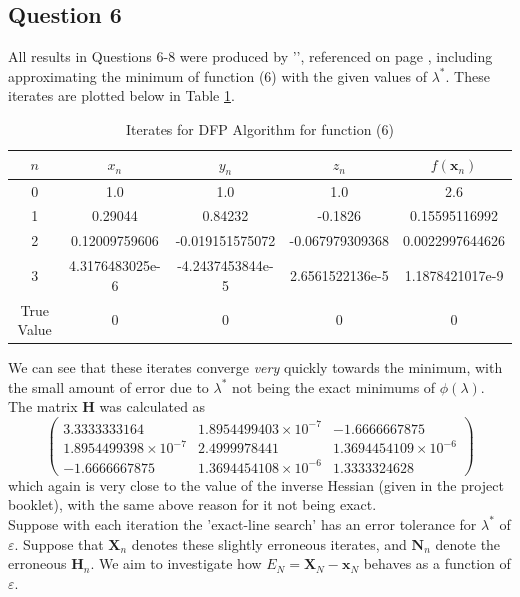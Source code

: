 \documentclass[10pt,a4paper,notitlepage]{article}
\newcommand{\x}{\mathbf{x}}
\newcommand{\X}{\mathbf{X}}
\begin{document}
\subsection*{\centering Question 6}
All results in Questions 6-8 were produced by '', referenced on page \pageref{cd:3}, including approximating the minimum of function (6) with the given values of $\lambda^{*}$. These iterates are plotted below in Table \ref{tb:4}.
\begin{table}[H]
\centering
\begin{tabular}{|ccccc|}
\hline
$n$ & $x_{n}$ & $y_{n}$ & $z_{n}$ & $f(\x_{n})$\\
\hline
0 & 1.0 & 1.0 & 1.0 & 2.6\\ 1 & 0.29044 & 0.84232 & -0.1826 & 0.15595116992\\ 2 & 0.12009759606 & -0.019151575072 & -0.067979309368 & 0.0022997644626\\ 3 & 4.3176483025e-6 & -4.2437453844e-5 & 2.6561522136e-5 & 1.1878421017e-9\\
\hline
True Value & 0 & 0 & 0 & 0\\
\hline
\end{tabular}
\caption{Iterates for DFP Algorithm for function (6)}\label{tb:4}
\end{table}
We can see that these iterates converge \textit{very} quickly towards the minimum, with the small amount of error due to $\lambda^{*}$ not being the exact minimums of $\phi(\lambda)$. The matrix $\mathbf{H}$ was calculated as
\begin{equation}
\begin{pmatrix}
3.3333333164 & 1.8954499403\times 10^{-7} & -1.6666667875\\ 1.8954499398\times 10^{-7} & 2.4999978441 & 1.3694454109\times 10^{-6}\\ -1.6666667875 & 1.3694454108\times 10^{-6} & 1.3333324628
\end{pmatrix}
\end{equation}
which again is very close to the value of the inverse Hessian (given in the project booklet), with the same above reason for it not being exact.\\

Suppose with each iteration the 'exact-line search' has an error tolerance for $\lambda^{*}$ of $\varepsilon$. Suppose that $\X_{n}$ denotes these slightly erroneous iterates, and $\mathbf{N}_{n}$ denote the erroneous $\mathbf{H}_{n}$. We aim to investigate how $E_{N}=\X_{N}-\x_{N}$ behaves as a function of $\varepsilon$. 
\end{document}
